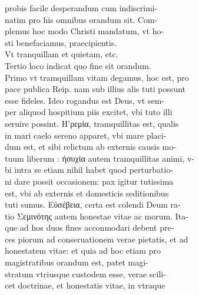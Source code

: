 \documentclass{article}
\begin{document}
\begin{pages}
                probis facile desperandum cum indiscrimi- \\
                natim pro his omnibus orandum sit. Com- \\
                plemus hoc modo Christi mandatum, vt ho- \\
                sti benefaciamus, praecipientis. \\
                Vt tranquillam et quietam, etc. \\
                Tertio loco indicat quo fine sit orandum. \\
                Primo vt tramquillam vitam degamus, hoc est, pro \\
                pace publica Reip. nam sub illius alis tuti possunt \\
                esse fideles. Ideo rogandus est Deus, vt sem- \\
                per aliquod hospitium piis excitet, vbi tuto illi \\
                seruire possint. H'ρεμία, tramquillitas est, qualis \\
                in mari caelo sereno apparet, vbi mare placi- \\
                dum est, et sibi relictum ab externis causis mo- \\
                tuum liberum : ἠσυχία autem tramquillitas animi, v- \\
                bi intra se etiam nihil habet quod perturbatio- \\
                ni dare possit occasionem: pax igitur tutissima \\
                est, vbi ab externis et domesticis seditionibus \\
                tuti sumus. Εὐσέβεια, certa est colendi Deum ra- \\
                tio Σεμινότης autem honestae vitae ac morum. Ita- \\
                que ad hos duos fines acconmodari debent pre- \\
                ces piorum ad conseruationem verae pietatis, et ad \\
                honestatem vitae: et quia ad hoc etiam pro \\
                magistratibus orandum est, patet magi- \\
                stratum vtriusque custodem esse, verae scili- \\
                cet doctrinae, et honestatis vitae, in vtraque \\

\end{pages}
\end{document}
